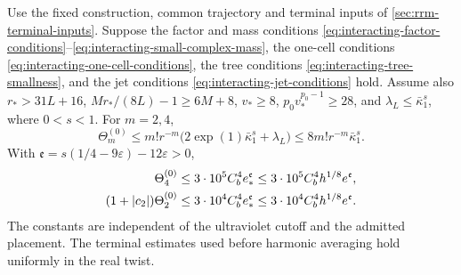 \begin{theorem}\label{thm:interacting-reference-error}
Use the fixed construction, common trajectory and terminal inputs of
\cref{sec:rrm-terminal-inputs}. Suppose the factor and mass conditions
\eqref{eq:interacting-factor-conditions}--\eqref{eq:interacting-small-complex-mass},
the one-cell conditions \eqref{eq:interacting-one-cell-conditions},
the tree conditions \eqref{eq:interacting-tree-smallness}, and the jet
conditions \eqref{eq:interacting-jet-conditions} hold. Assume also
$r_*>31L+16$, $Mr_*/(8L)-1\ge6M+8$,
$v_*\ge8$, $p_0v_*^{p_0-1}\ge28$, and
$\lambda_L\le\bar\kappa_1^s$, where $0<s<1$.
For $m=2,4$,
\begin{equation}\label{eq:interacting-Theta-bound}
 \Theta_m^{(0)}\le
        m!r^{-m}\bigl(2\exp(1)\bar\kappa_1^s+\lambda_L\bigr)
                       \le8m!r^{-m}\bar\kappa_1^s.
\end{equation}
With
$\mathfrak e=s(1/4-9\varepsilon)-12\varepsilon>0$,
\begin{align}
 \Theta_4^{(0)}
    &\le3\cdot10^5 C_b^4e_*^{\mathfrak e}
           \le3\cdot10^5C_b^4h^{1/8}e^{\mathfrak e},\notag\\
 (1+|c_2|)\Theta_2^{(0)}
    &\le3\cdot10^4C_b^4e_*^{\mathfrak e}
           \le3\cdot10^4C_b^4h^{1/8}e^{\mathfrak e}.
                                    \label{eq:interacting-final-terminal-error}
\end{align}
The constants are independent of the ultraviolet cutoff and the
admitted placement. The terminal estimates used before harmonic
averaging hold uniformly in the real twist.
\end{theorem}

